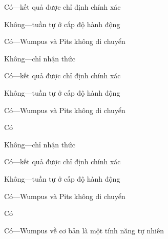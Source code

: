 \documentclass{article}
\begin{document}
\begin{huge}
 Có---kết quả được chỉ định chính xác

 Không---tuần tự ở cấp độ hành động

 Có---Wumpus và Pits không di chuyển



 Không---chỉ nhận thức 

 Có---kết quả được chỉ định chính xác

 Không---tuần tự ở cấp độ hành động

 Có---Wumpus và Pits không di chuyển

 Có



 Không---chỉ nhận thức 

 Có---kết quả được chỉ định chính xác

 Không---tuần tự ở cấp độ hành động

 Có---Wumpus và Pits không di chuyển

 Có

 Có---Wumpus về cơ bản là một tính năng tự nhiên





\vspace*{0.4in}

\textwidth
{}


\vspace*{0.4in}

\textwidth
{}


\vspace*{0.4in}


\end{huge}
\end{document}
